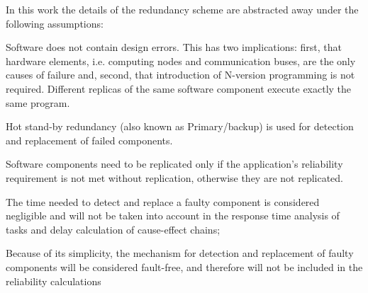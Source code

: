 {%


In this work the details of the redundancy scheme are abstracted away under the following assumptions:
\begin{enumerate*}[label=(\roman*)]
    \item Software does not contain design errors. This has two implications: first, that hardware elements, i.e. computing nodes and communication buses, are the only causes of failure and, second, that introduction of N-version programming is not required. Different replicas of the same software component execute exactly the same program.
	\item Hot stand-by redundancy (also known as Primary/backup) is used for detection and replacement of failed components.
	\item Software components need to be replicated only if the application's reliability requirement is not met without replication, otherwise they are not replicated.
	\item The time needed to detect and replace a faulty component is considered negligible and will not be taken into account in the response time analysis of tasks and delay calculation of cause-effect chains;
	\item Because of its simplicity, the mechanism for detection and replacement of faulty components will be considered fault-free, and therefore will not be included in the reliability calculations
\end{enumerate*}

}
